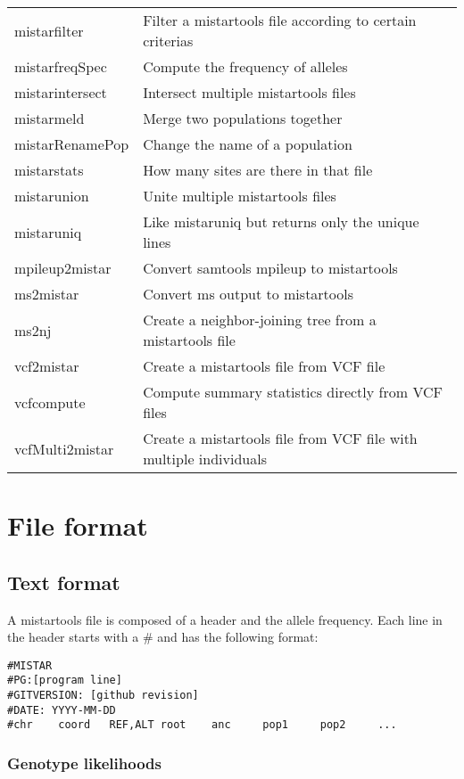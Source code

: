 \documentclass[a4paper]{article}
\begin{document}
\begin{tabular}{|l|l|}
mistarfilter & Filter a mistartools file according to certain criterias \\
mistarfreqSpec & Compute the frequency of alleles \\
mistarintersect & Intersect multiple mistartools files \\
mistarmeld & Merge two populations together \\
mistarRenamePop & Change the name of a population \\
mistarstats & How many sites are there in that file \\
mistarunion & Unite multiple mistartools files \\
mistaruniq & Like mistaruniq but returns only the unique lines \\
mpileup2mistar & Convert samtools mpileup to mistartools \\
ms2mistar & Convert ms output to mistartools \\
ms2nj & Create a neighbor-joining tree from a mistartools file \\
vcf2mistar & Create a mistartools file from VCF file \\
vcfcompute & Compute summary statistics directly from VCF files \\
vcfMulti2mistar & Create a mistartools file from VCF file with multiple individuals \\
\hline
\end{tabular}

\section{File format}

\subsection{Text format}

\noindent  A mistartools file is composed of a header and the allele frequency. Each line in the header starts with a \# and has the following format:

\begin{verbatim}
#MISTAR
#PG:[program line]
#GITVERSION: [github revision]
#DATE: YYYY-MM-DD
#chr    coord   REF,ALT root    anc     pop1     pop2     ...
\end{verbatim}

\subsubsection{Genotype likelihoods}
\end{document}
